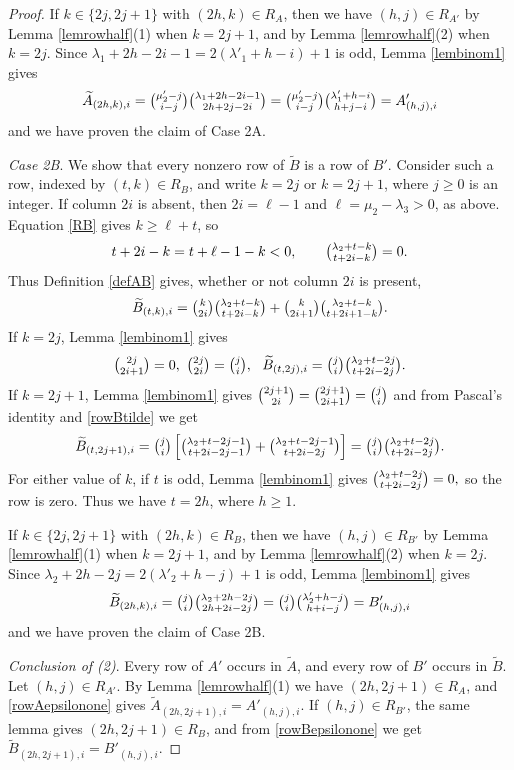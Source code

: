 \documentclass[11pt]{amsart}
\theoremstyle{remark}
\theoremstyle{definition}
\newcommand{\la}{\lambda}
\numberwithin{equation}{section}
\begin{document}
\begin{proof}
	If $k\in\{2j,2j+1\}$ with
	$(2h,k)\in R_A$, then we have $(h,j)\in R_{A'}$ by
	Lemma \ref{lemrowhalf}(1) when $k=2j+1$, and by
	Lemma \ref{lemrowhalf}(2) when $k=2j$.
	Since $\la_1+2h-2i-1=2(\la'_1+h-i)+1$ is odd,
	Lemma \ref{lembinom1} gives
	\begin{equation}\label{rowAepsilonone}
			\widetilde A_{(2h,k),i}
			=\tbinom{\mu'_2-j}{i-j}
			\tbinom{\la_1+2h-2i-1}{2h+2j-2i}=\tbinom{\mu'_2-j}{i-j}
			\tbinom{\la'_1+h-i}{h+j-i}
			=A'_{(h,j),i}
	\end{equation}
	and we have proven the claim of Case 2A.
	
	\textit{Case 2B}. We show that every nonzero row of
	$\widetilde B$ is a row of $B'$.
	Consider such a row, indexed by $(t,k)\in R_B$, and write
	$k=2j$ or $k=2j+1$, where $j\ge0$ is an integer.
	If column $2i$ is absent, then $2i=\ell-1$ and
	$\ell=\mu_2-\la_3>0$, as above.
	Equation \eqref{RB} gives $k\ge\ell+t$, so
	\[
	t+2i-k=t+\ell-1-k<0,\qquad
	\tbinom{\la_2+t-k}{t+2i-k}=0.
	\]
	Thus Definition \ref{defAB} gives, whether or not column $2i$
	is present,
		\begin{equation}\label{rowBtilde}
		\widetilde B_{(t,k),i}
		=\tbinom{k}{2i}
		\tbinom{\la_2+t-k}{t+2i-k}+\tbinom{k}{2i+1}
		\tbinom{\la_2+t-k}{t+2i+1-k}.
	\end{equation}
	If $k=2j$, Lemma \ref{lembinom1} gives
	\[
	\begin{gathered}
		\tbinom{2j}{2i+1}=0,\ \tbinom{2j}{2i}=\tbinom ji,\ \
		\widetilde B_{(t,2j),i}
		=\tbinom ji\tbinom{\la_2+t-2j}{t+2i-2j}.
	\end{gathered}
	\]
	If $k=2j+1$, Lemma \ref{lembinom1} gives
$
	\tbinom{2j+1}{2i}
	=\tbinom{2j+1}{2i+1}
	=\tbinom ji
$
	and from
	Pascal's identity and \eqref{rowBtilde} we get
	\[
		\widetilde B_{(t,2j+1),i}
		=\tbinom ji\left[
		\tbinom{\la_2+t-2j-1}{t+2i-2j-1}
		+\tbinom{\la_2+t-2j-1}{t+2i-2j}
		\right]=\tbinom ji\tbinom{\la_2+t-2j}{t+2i-2j}.
	\]
	For either value of $k$, if $t$ is odd, Lemma \ref{lembinom1}
	gives
$
	\tbinom{\la_2+t-2j}{t+2i-2j}=0,
$
	so the row is zero. Thus we have $t=2h$, where $h\ge1$.
	
	If $k\in\{2j,2j+1\}$ with
	$(2h,k)\in R_B$, then we have $(h,j)\in R_{B'}$ by
	Lemma \ref{lemrowhalf}(1) when $k=2j+1$, and by
	Lemma \ref{lemrowhalf}(2) when $k=2j$.
	Since $\la_2+2h-2j=2(\la'_2+h-j)+1$ is odd,
	Lemma \ref{lembinom1} gives
	\begin{equation}\label{rowBepsilonone}
			\widetilde B_{(2h,k),i}
			=\tbinom ji\tbinom{\la_2+2h-2j}{2h+2i-2j}=\tbinom ji\tbinom{\la'_2+h-j}{h+i-j}
			=B'_{(h,j),i}
	\end{equation}
and we have proven the claim of Case 2B.

	\textit{Conclusion of (2)}. Every row of $A'$ occurs in
	$\widetilde A$, and every row of $B'$ occurs in $\widetilde B$.
	Let $(h,j)\in R_{A'}$. By Lemma \ref{lemrowhalf}(1) we have
	$(2h,2j+1)\in R_A$, and \eqref{rowAepsilonone} gives
	$\widetilde A_{(2h,2j+1),i}=A'_{(h,j),i}$.
	If $(h,j)\in R_{B'}$, the same lemma gives
	$(2h,2j+1)\in R_B$, and from \eqref{rowBepsilonone} we get
	$\widetilde B_{(2h,2j+1),i}=B'_{(h,j),i}$.
\end{proof}
\end{document}
